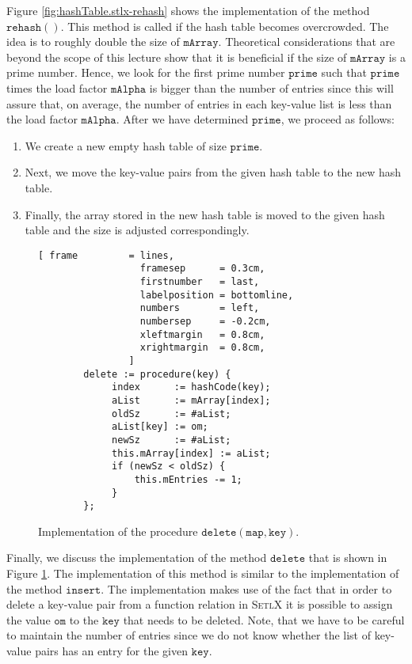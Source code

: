 Figure \ref{fig:hashTable.stlx-rehash} shows the implementation of the method
$\mathtt{rehash}()$.  This method is called if the hash table becomes overcrowded.  The idea is to
roughly double the size of $\mathtt{mArray}$.  Theoretical considerations that are  beyond the scope
of this lecture show that it is beneficial if the size of $\mathtt{mArray}$ is a prime number.
Hence, we look for the first prime number $\mathtt{prime}$ such that $\mathtt{prime}$ times the load
factor $\mathtt{mAlpha}$ is bigger than the
number of entries since this will assure that, on average, the number of entries in each key-value
list is less than the load factor $\mathtt{mAlpha}$.  After we have determined $\mathtt{prime}$, we
proceed as follows: 
\begin{enumerate}
\item We create a new empty hash table of size $\mathtt{prime}$.
\item Next, we move the key-value pairs from the given hash table to the new hash table.
\item Finally, the array stored in the new hash table is moved to the given hash table
      and the size is adjusted correspondingly.
\end{enumerate}





\begin{figure}[!ht]
\centering
\begin{Verbatim}[ frame         = lines, 
                  framesep      = 0.3cm, 
                  firstnumber   = last,
                  labelposition = bottomline,
                  numbers       = left,
                  numbersep     = -0.2cm,
                  xleftmargin   = 0.8cm,
                  xrightmargin  = 0.8cm,
                ]
        delete := procedure(key) {
             index      := hashCode(key);
             aList      := mArray[index];
             oldSz      := #aList;
             aList[key] := om;
             newSz      := #aList;
             this.mArray[index] := aList;
             if (newSz < oldSz) {
                 this.mEntries -= 1;
             }    
        };
\end{Verbatim}
\vspace*{-0.3cm}
\caption{Implementation of the procedure $\mathtt{delete}(\mathtt{map}, \mathtt{key})$.}
\label{fig:hashTable.stlx-delete}
\end{figure}

Finally, we discuss the implementation of the method $\mathtt{delete}$ that is shown in Figure
\ref{fig:hashTable.stlx-delete}.  The implementation of this method is similar to the implementation
of the method $\mathtt{insert}$.   The implementation makes use of the fact that in order to delete
a key-value pair from a function relation in \textsc{SetlX} it is possible to assign the value
$\mathtt{om}$ to the $\mathtt{key}$ that needs to be deleted. Note, that we have to be careful to
maintain the number of entries since we do not know whether the list of key-value pairs has an entry
for the given $\mathtt{key}$.

